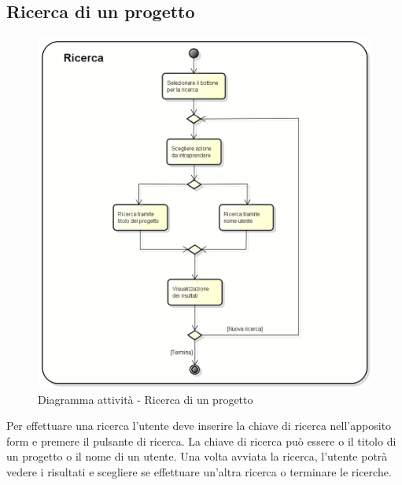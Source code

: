\subsection{Ricerca di un progetto}
\begin{figure}[h] 
	\centering 
	\includegraphics[width=0.9\linewidth] {img/activity_ricerca.png}
	\caption{Diagramma attività - Ricerca di un progetto} 
\end{figure}
Per effettuare una ricerca l'utente deve inserire la chiave di ricerca nell'apposito form e premere il pulsante di ricerca. La chiave di ricerca può essere o il titolo di un progetto o il nome di un utente. Una volta avviata la ricerca, l'utente potrà vedere i risultati e scegliere se effettuare un'altra ricerca o terminare le ricerche.
\newpage

